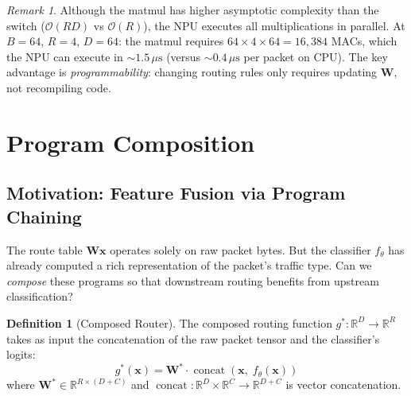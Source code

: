 \documentclass[11pt,a4paper,twoside]{article}
\theoremstyle{definition}
\newtheorem{definition}{Definition}[section]
\theoremstyle{remark}
\newtheorem{remark}{Remark}[section]
\newcommand{\BigO}{\mathcal{O}}
\newcommand{\R}{\mathbb{R}}
\newcommand{\concat}{\operatorname{concat}}
\newcommand{\mat}[1]{\mathbf{#1}}
\newcommand{\vect}[1]{\mathbf{#1}}
\begin{document}
\begin{remark}
Although the matmul has higher asymptotic complexity than the switch ($\BigO(RD)$ vs $\BigO(R)$), the NPU executes all multiplications in parallel. At $B = 64$, $R = 4$, $D = 64$: the matmul requires $64 \times 4 \times 64 = 16{,}384$ MACs, which the NPU can execute in ${\sim}1.5\,\mu\text{s}$ (versus ${\sim}0.4\,\mu\text{s}$ per packet on CPU). The key advantage is \emph{programmability}: changing routing rules only requires updating $\mat{W}$, not recompiling code.
\end{remark}


\section{Program Composition}
\label{sec:composition}

\subsection{Motivation: Feature Fusion via Program Chaining}

The route table $\mat{W}\vect{x}$ operates solely on raw packet bytes. But the classifier $f_\theta$ has already computed a rich representation of the packet's traffic type. Can we \emph{compose} these programs so that downstream routing benefits from upstream classification?

\begin{definition}[Composed Router]
\label{def:composed}
The composed routing function $g^*: \R^D \to \R^R$ takes as input the concatenation of the raw packet tensor and the classifier's logits:
\begin{equation}
g^*(\vect{x}) = \mat{W}^* \cdot \concat(\vect{x},\; f_\theta(\vect{x}))
\end{equation}
where $\mat{W}^* \in \R^{R \times (D+C)}$ and $\concat: \R^D \times \R^C \to \R^{D+C}$ is vector concatenation.
\end{definition}
\end{document}
